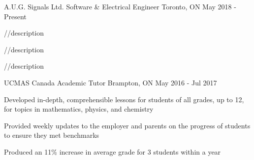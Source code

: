 \begin{cventries}
  \cventry
    {A.U.G. Signals Ltd.}
    {Software \& Electrical Engineer}
    {Toronto, ON}
    {May 2018 - Present}
    {
      \begin{cvitems}
        \item {//description}
        \item {//description}
        \item {//description}
      \end{cvitems}
    }
  \cventry
    {UCMAS Canada}
    {Academic Tutor}
    {Brampton, ON}
    {May 2016 - Jul 2017}
    {
      \begin{cvitems}
        \item {Developed in-depth, comprehensible lessons for students of all grades, up to 12, for topics in mathematics, physics, and chemistry}
        \item {Provided weekly updates to the employer and parents on the progress of students to ensure they met benchmarks}
	\item{Produced an 11\% increase in average grade for 3 students within a year}
      \end{cvitems}
    }
\end{cventries}
